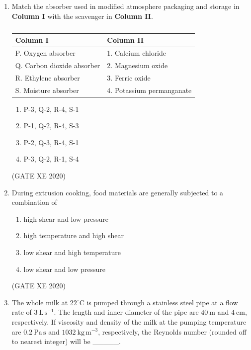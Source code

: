 \documentclass[12pt]{article}
\begin{document}
\begin{enumerate}
\begin{enumerate}
\item P-1, Q-3, R-4, S-2
\item P-2, Q-3, R-1, S-4
\item P-2, Q-3, R-4, S-1
\item P-4, Q-3, R-1, S-2
\end{enumerate}
(GATE XE 2020)

\item Match the absorber used in modified atmosphere packaging and storage in \textbf{Column I} with the scavenger in \textbf{Column II}.
\begin{table}[H]
\centering
\caption{}
\label{}
\begin{tabular}{|l|l|}
\hline
Column I & Column II \\
\hline
P. Oxygen absorber  & 1. Calcium chloride \\
Q. Carbon dioxide absorber & 2. Magnesium oxide \\
R. Ethylene absorber & 3. Ferric oxide \\
S. Moisture absorber & 4. Potassium permanganate \\
\hline
\end{tabular}
\end{table}

\begin{enumerate}
\item P-3, Q-2, R-4, S-1
\item P-1, Q-2, R-4, S-3
\item P-2, Q-3, R-4, S-1
\item P-3, Q-2, R-1, S-4
\end{enumerate}
(GATE XE 2020)

\item During extrusion cooking, food materials are generally subjected to a combination of
\begin{enumerate}
\item high shear and low pressure
\item high temperature and high shear
\item low shear and high temperature
\item low shear and low pressure
\end{enumerate}
(GATE XE 2020)

\item The whole milk at $22^{\circ}\mathrm{C}$ is pumped through a stainless steel pipe at a flow rate of $3\ \mathrm{L\,s^{-1}}$. The length and inner diameter of the pipe are $40\ \mathrm{m}$ and $4\ \mathrm{cm}$, respectively. If viscosity and density of the milk at the pumping temperature are $0.2\ \mathrm{Pa\,s}$ and $1032\ \mathrm{kg\,m^{-3}}$, respectively, the Reynolds number (rounded off to nearest integer) will be \_\_\_\_\_.  


\end{enumerate}
\end{document}
